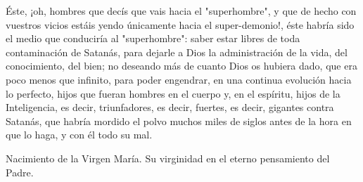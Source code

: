 \documentclass[12pt]{book} %
\begin{document}
Éste, ¡oh, hombres que decís que vais hacia el "superhombre", y que de hecho con vuestros vicios estáis yendo únicamente hacia el super-demonio!, éste habría sido el medio que conduciría al "superhombre": saber estar libres de toda contaminación de Satanás, para dejarle a Dios la administración de la vida, del conocimiento, del bien; no deseando más de cuanto Dios os hubiera dado, que era poco menos que infinito, para poder engendrar, en una continua evolución hacia lo perfecto, hijos que fueran hombres en el cuerpo y, en el espíritu, hijos de la Inteligencia, es decir, triunfadores, es decir, fuertes, es decir, gigantes contra Satanás, que habría mordido el polvo muchos miles de siglos antes de la hora en que lo haga, y con él todo su mal. 
 
Nacimiento de la Virgen María.
Su virginidad en el eterno pensamiento del Padre. 
 
\end{document}

